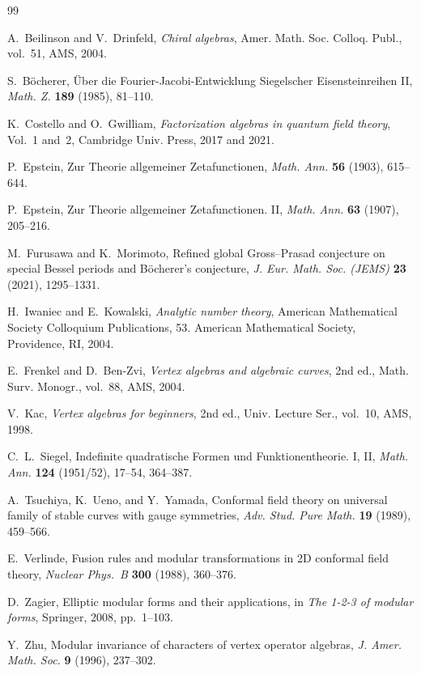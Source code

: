 \documentclass[11pt,reqno]{amsart}
\theoremstyle{definition}
\theoremstyle{remark}
\numberwithin{equation}{section}
\begin{document}
\begin{thebibliography}{99}

A.~Beilinson and V.~Drinfeld,
\textit{Chiral algebras},
Amer. Math. Soc. Colloq. Publ., vol.~51, AMS, 2004.

S.~B\"ocherer,
\"Uber die Fourier-Jacobi-Entwicklung Siegelscher Eisensteinreihen II,
\textit{Math. Z.} \textbf{189} (1985), 81--110.

K.~Costello and O.~Gwilliam,
\textit{Factorization algebras in quantum field theory},
Vol.~1 and~2, Cambridge Univ. Press, 2017 and 2021.

P.~Epstein,
Zur Theorie allgemeiner Zetafunctionen,
\textit{Math. Ann.} \textbf{56} (1903), 615--644.

P.~Epstein,
Zur Theorie allgemeiner Zetafunctionen. II,
\textit{Math. Ann.} \textbf{63} (1907), 205--216.

M.~Furusawa and K.~Morimoto,
Refined global Gross--Prasad conjecture on special Bessel
periods and B\"ocherer's conjecture,
\textit{J. Eur. Math. Soc. (JEMS)} \textbf{23} (2021), 1295--1331.

H.~Iwaniec and E.~Kowalski,
\textit{Analytic number theory},
American Mathematical Society Colloquium Publications, 53.
American Mathematical Society, Providence, RI, 2004.

E.~Frenkel and D.~Ben-Zvi,
\textit{Vertex algebras and algebraic curves},
2nd ed., Math. Surv. Monogr., vol.~88, AMS, 2004.

V.~Kac,
\textit{Vertex algebras for beginners},
2nd ed., Univ. Lecture Ser., vol.~10, AMS, 1998.

C.~L.~Siegel,
Indefinite quadratische Formen und Funktionentheorie. I, II,
\textit{Math. Ann.} \textbf{124} (1951/52), 17--54, 364--387.

A.~Tsuchiya, K.~Ueno, and Y.~Yamada,
Conformal field theory on universal family of stable curves with
gauge symmetries,
\textit{Adv. Stud. Pure Math.} \textbf{19} (1989), 459--566.

E.~Verlinde,
Fusion rules and modular transformations in 2D conformal field theory,
\textit{Nuclear Phys.~B} \textbf{300} (1988), 360--376.

D.~Zagier,
Elliptic modular forms and their applications,
in \textit{The 1-2-3 of modular forms}, Springer, 2008, pp.~1--103.

Y.~Zhu,
Modular invariance of characters of vertex operator algebras,
\textit{J. Amer. Math. Soc.} \textbf{9} (1996), 237--302.

\end{thebibliography}
\end{document}
